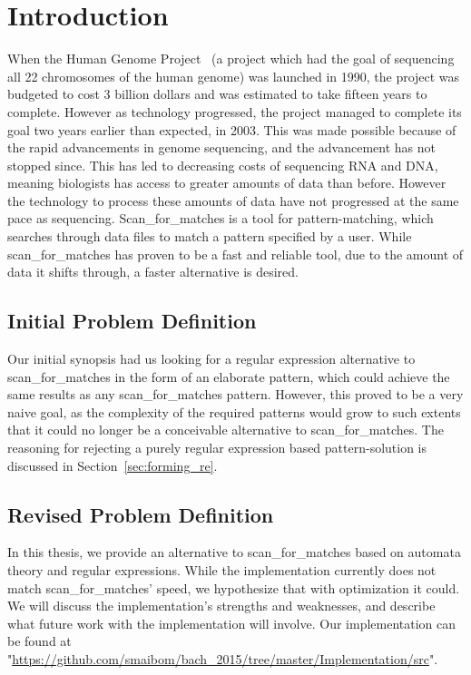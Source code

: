 \section{Introduction}%
When the Human Genome Project~\cite{hgp} (a project which had the goal of sequencing 
all 22 chromosomes of the human genome) was launched in 1990, the project was 
budgeted to cost 3 billion dollars and was estimated to take fifteen years 
to complete. However as technology progressed, the project managed to complete 
its goal two years earlier than expected, in 2003. This was made possible 
because of the rapid advancements in genome sequencing, and the advancement 
has not stopped since. This has led to decreasing costs of sequencing RNA and DNA, 
meaning biologists has access to greater amounts of data than before. 
However the technology to process these amounts of data have not progressed at 
the same pace as sequencing. Scan\_for\_matches is a tool for pattern-matching, 
which searches through data files to match a pattern specified by a user. 
While scan\_for\_matches has proven to be a fast and reliable 
tool, due to the amount of data it shifts through, a faster alternative 
is desired.

\subsection{Initial Problem Definition} %
Our initial synopsis had us looking for a regular expression alternative to scan\_for\_matches in the form of an elaborate pattern, which could achieve the same results as any scan\_for\_matches pattern. However, this proved to be a very naive goal, as the complexity of the required patterns would grow to such extents that it could no longer be a conceivable alternative to scan\_for\_matches. The reasoning for rejecting a purely regular expression based pattern-solution is discussed in Section~\ref{sec:forming_re}.

\subsection{Revised Problem Definition}
In this thesis, we provide an alternative to scan\_for\_matches based on 
automata theory and regular expressions. While the implementation currently 
does not match scan\_for\_matches' speed, we hypothesize that with optimization it could. We will 
discuss the implementation's strengths and weaknesses, and describe what 
future work with the implementation will involve.
Our implementation can be found at 
"\url{https://github.com/smaibom/bach_2015/tree/master/Implementation/src}".
\begin{comment}
After hearing about this problem, we thought that there must be a better 
way of searching through data that is also theoretically sound. Our first 
thought was using automata-based searching methods, since this provides a 
calculable best- and worst-case run time while being theoretically sound. 
Since regular expressions uses an automata-based way of searching, we hypothesized 
that implementing regular expressions which have the same functions as 
scan\_for\_matches would lead to faster run times.
\end{comment}
